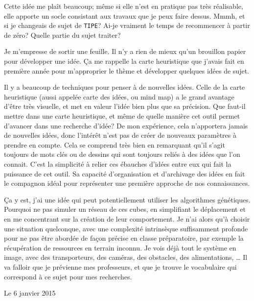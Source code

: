 \documentclass[12pt,final]{report} %
\newcommand{\datemarge}[1]{%
   \newpage
   
        {\hfill{\color{blue}#1}}

}
\newcommand{\majuscule}[1]{{\large \texttt{#1}}}
\begin{document}
\begin{cursive}
{Cette idée me plaît beaucoup; même si elle n'est en pratique pas très réalisable, elle apporte un socle consistant aux travaux que je peux faire dessus.%
Mmmh, et si je changeais de sujet de \majuscule{TIPE}? Ai-je vraiment le temps de recommencer à partir de zéro?
Quelle partie du sujet traiter? 

Je m'empresse de sortir une feuille. Il n'y a rien de mieux qu'un brouillon papier pour développer une idée. 
Ça me rappelle la carte heuristique que j'avais fait en première année pour m'approprier le thème et développer quelques idées de sujet.

Il y a beaucoup de techniques pour penser à de nouvelles idées.%
Celle de la carte heuristique (aussi appelée carte des idées, ou mind map) a le grand avantage d'être très visuelle, et met en valeur l'idée bien plus que sa précision. 
Que faut-il mettre dans une carte heuristique, et même de quelle manière cet outil permet d'avancer dans une recherche d'idée?
De mon expérience, cela n'apportera jamais de nouvelles idées, donc l'intérêt n'est pas de créer de nouveaux paramètres à prendre en compte.
Cela se comprend très bien en remarquant qu'il s'agit toujours de mots clés ou de dessins qui sont toujours reliés à des idées que l'on connait.
C'est la simplicité à relier ces ébauches d'idées entre eux qui fait la puissance de cet outil. 
Sa capacité d'organisation et d'archivage des idées en fait le compagnon idéal pour représenter une première approche de nos connaissances.

Ça y est, j'ai une idée qui peut potentiellement utiliser les algorithmes génétiques. 
Pourquoi ne pas simuler un réseau de ces cubes, en simplifiant le déplacement et en me concentrant sur la création de leur comportement.
Je n'ai alors qu'à choisir une situation quelconque, avec une complexité intrinsèque suffisamment profonde pour ne pas être abordée de façon précise en classe préparatoire, par exemple la récupération de ressources en terrain inconnu.
Je vois déjà tout le système en image, avec des transporteurs, des caméras, des obstacles, des alimentations, \dots
Il va falloir que je prévienne mes professeurs, et que je trouve le vocabulaire qui correspond à ce sujet pour mes recherches.

\datemarge{Le 6 janvier 2015}

}
\end{cursive}
\end{document}
